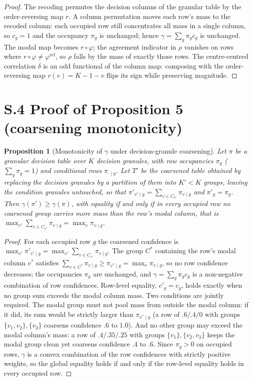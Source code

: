 \documentclass[11pt,a4paper]{article}
\newtheorem*{proposition}{Proposition}
\begin{document}
\begin{proof}
The recoding permutes the decision columns of the granular table by the
order-reversing map $r$. A column permutation moves each row's mass to the
recoded column: each occupied row still concentrates all mass in a single
column, so $c_g=1$ and the occupancy $\pi_g$ is unchanged; hence
$\gamma=\sum_g\pi_g c_g$ is unchanged. The modal map becomes
$r\circ\varphi$; the agreement indicator in $\rho$ vanishes on rows where
$r\circ\varphi\neq\varphi^{\mathrm{ref}}$, so $\rho$ falls by the mass of
exactly those rows. The centre-centred correlation
$\delta$ is an odd functional of the column map: composing with the
order-reversing map $r(v)=K-1-v$ flips its sign while preserving
magnitude.
\end{proof}

\section*{S.4 Proof of Proposition 5 (coarsening monotonicity)}

\begin{proposition}[Monotonicity of $\gamma$ under decision-granule coarsening]
Let $\pi$ be a granular decision table over $K$ decision granules, with row
occupancies $\pi_g$ ($\sum_g \pi_g = 1$) and conditional rows
$\pi_{\cdot\mid g}$. Let $T'$ be the coarsened table obtained by replacing
the decision granules by a partition of them into $K' < K$ groups, leaving
the condition granules untouched, so that
$\pi'_{v'\mid g} = \sum_{v \in C_{v'}} \pi_{v\mid g}$ and $\pi'_g = \pi_g$.
Then $\gamma(\pi') \geq \gamma(\pi)$, with equality if and only if in every
occupied row no coarsened group carries more mass than the row's modal
column, that is
$\max_{v'} \sum_{v \in C_{v'}} \pi_{v\mid g} = \max_v \pi_{v\mid g}$.
\end{proposition}

\begin{proof}
For each occupied row $g$ the coarsened confidence is
$\max_{v'} \pi'_{v'\mid g} = \max_{v'} \sum_{v \in C_{v'}} \pi_{v\mid g}$.
The group $C^\ast$ containing the row's modal column $v^\ast$ satisfies
$\sum_{v \in C^\ast} \pi_{v\mid g} \geq \pi_{v^\ast\mid g} = \max_v \pi_{v\mid g}$,
so no row confidence decreases; the occupancies $\pi_g$ are unchanged, and
$\gamma = \sum_g \pi_g c_g$ is a non-negative combination of row
confidences. Row-level equality, $c'_g = c_g$, holds exactly when no group
sum exceeds the modal column mass. Two conditions are jointly required.
The modal group must not pool mass from outside the modal column: if it
did, its sum would be strictly larger than $\pi_{v^\ast\mid g}$ (a row of
$.6/.4/0$ with groups $\{v_1,v_2\},\{v_3\}$ coarsens confidence $.6$ to
$1.0$). And no other group may exceed the modal column's mass: a row of
$.4/.35/.25$ with groups $\{v_1\},\{v_2,v_3\}$ keeps the modal group clean
yet coarsens confidence $.4$ to $.6$. Since $\pi_g>0$ on occupied rows,
$\gamma$ is a convex combination of the row confidences with strictly
positive weights, so the global equality holds if and only if the row-level
equality holds in every occupied row.
\end{proof}
\end{document}
